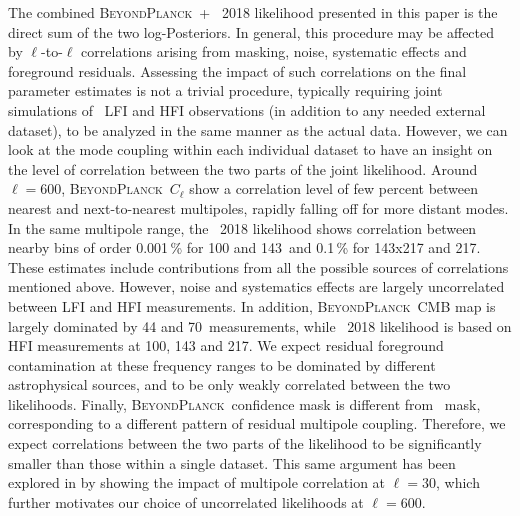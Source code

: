 \documentclass[twocolumn]{aa}
\newcommand{\BP}{\textsc{BeyondPlanck}}
\begin{document}
The combined \BP\ + \Planck\ 2018 likelihood presented in this paper is 
the direct sum of the two log-Posteriors. In general, this procedure 
may be affected by $\ell$-to-$\ell$ correlations arising from masking, 
noise, systematic effects and foreground residuals. Assessing the 
impact of such correlations on the final parameter estimates is not 
a trivial procedure, typically requiring joint simulations of \Planck\ 
LFI and HFI observations (in addition to any needed external dataset), 
to be analyzed in the same manner as the actual data.
However, we can look at the mode coupling within each individual dataset 
to have an insight on the level of correlation between the two parts of 
the joint likelihood. Around $\ell = 600$, \BP\ $C_\ell$ show a 
correlation level of few percent between nearest and next-to-nearest 
multipoles, rapidly falling off for more distant modes. In the same 
multipole range, the \Planck\ 2018 likelihood shows correlation between 
nearby bins of order 0.001\,\% for 100 and 143\GHz\ and 0.1\,\% for 143x217 and 
217\GHz. These estimates include contributions from all the possible 
sources of correlations mentioned above. However, noise and systematics 
effects are largely uncorrelated between LFI and HFI measurements. 
In addition, \BP\ CMB map is largely dominated by 44 and 70\GHz\ 
measurements, while \Planck\ 2018 likelihood is based on HFI measurements 
at 100, 143 and 217\GHz. We expect residual foreground contamination at 
these frequency ranges to be dominated by different astrophysical sources, 
and to be only weakly correlated between the two likelihoods. Finally, 
\BP\ confidence mask is different from \Planck\ mask, corresponding to 
a different pattern of residual multipole coupling. Therefore, we expect 
correlations between the two parts of the likelihood to be significantly 
smaller than those within a single dataset. This same argument has been
explored in \citet{Gjerlow_2013} by showing the impact of multipole 
correlation at $\ell=30$, which further motivates our choice of uncorrelated
likelihoods at $\ell=600$.  
\end{document}
